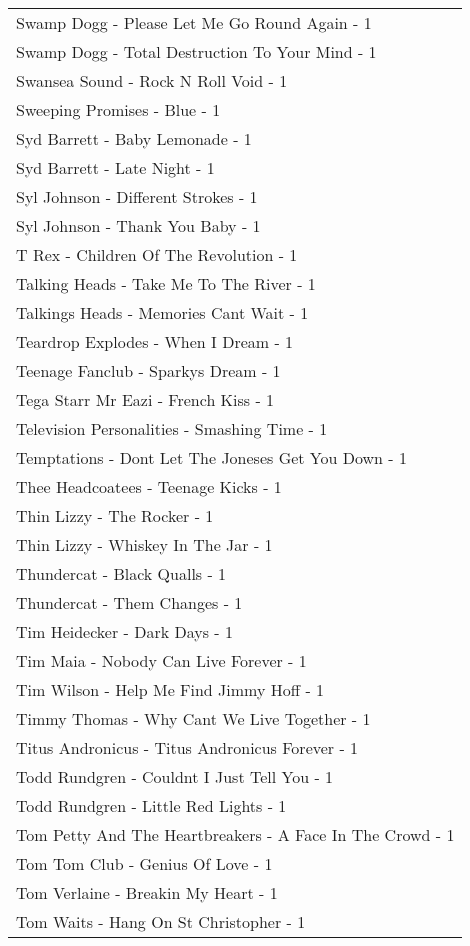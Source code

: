 \documentclass[
]{article}
\begin{document}
\begin{longtable}{l}
Swamp Dogg - Please Let Me Go Round Again - 1 \\ 
Swamp Dogg - Total Destruction To Your Mind - 1 \\ 
Swansea Sound - Rock N Roll Void - 1 \\ 
Sweeping Promises - Blue - 1 \\ 
Syd Barrett - Baby Lemonade - 1 \\ 
Syd Barrett - Late Night - 1 \\ 
Syl Johnson - Different Strokes - 1 \\ 
Syl Johnson - Thank You Baby - 1 \\ 
T Rex - Children Of The Revolution - 1 \\ 
Talking Heads - Take Me To The River - 1 \\ 
Talkings Heads - Memories Cant Wait - 1 \\ 
Teardrop Explodes - When I Dream - 1 \\ 
Teenage Fanclub - Sparkys Dream - 1 \\ 
Tega Starr Mr Eazi - French Kiss - 1 \\ 
Television Personalities - Smashing Time - 1 \\ 
Temptations - Dont Let The Joneses Get You Down - 1 \\ 
Thee Headcoatees - Teenage Kicks - 1 \\ 
Thin Lizzy - The Rocker - 1 \\ 
Thin Lizzy - Whiskey In The Jar - 1 \\ 
Thundercat - Black Qualls - 1 \\ 
Thundercat - Them Changes - 1 \\ 
Tim Heidecker - Dark Days - 1 \\ 
Tim Maia - Nobody Can Live Forever - 1 \\ 
Tim Wilson - Help Me Find Jimmy Hoff - 1 \\ 
Timmy Thomas - Why Cant We Live Together - 1 \\ 
Titus Andronicus - Titus Andronicus Forever - 1 \\ 
Todd Rundgren - Couldnt I Just Tell You - 1 \\ 
Todd Rundgren - Little Red Lights - 1 \\ 
Tom Petty And The Heartbreakers - A Face In The Crowd - 1 \\ 
Tom Tom Club - Genius Of Love - 1 \\ 
Tom Verlaine - Breakin My Heart - 1 \\ 
Tom Waits - Hang On St Christopher - 1 \\ 

\end{longtable}
\end{document}
